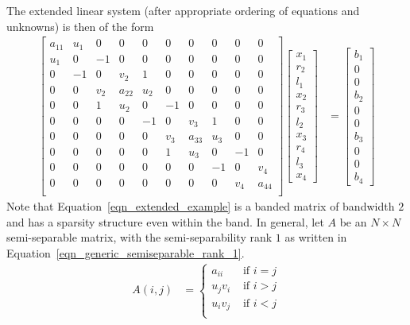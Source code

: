 \documentclass[final,leqno]{siamltex}
\begin{document}
The extended linear system (after appropriate ordering of equations and unknowns) is then of the form
\begin{align}
\begin{bmatrix}
a_{11} & u_1 & 0 & 0 & 0 & 0 & 0 & 0 & 0 & 0\\
u_1 & 0 & -1 & 0 & 0 & 0 & 0 & 0 & 0 & 0\\
0 & -1 & 0 & v_2 & 1 & 0 & 0 & 0 & 0 & 0\\
0 & 0 & v_2 & a_{22} & u_2 & 0 & 0 & 0 & 0 & 0\\
0 & 0 & 1 & u_2 & 0 & -1 & 0 & 0 & 0 & 0\\
0 & 0 & 0 & 0 & -1 & 0 & v_3 & 1 & 0 & 0\\
0 & 0 & 0 & 0 & 0 & v_3 & a_{33} & u_3 & 0 & 0\\
0 & 0 & 0 & 0 & 0 & 1 & u_{3} & 0 & -1 & 0\\
0 & 0 & 0 & 0 & 0 & 0 & 0 & -1 & 0 & v_4\\
0 & 0 & 0 & 0 & 0 & 0 & 0 & 0 & v_4 & a_{44}\\
\end{bmatrix}
\begin{bmatrix}
x_1\\
r_2\\
l_1\\
x_2\\
r_3\\
l_2\\
x_3\\
r_4\\
l_3\\
x_4
\end{bmatrix}
& =
\begin{bmatrix}
b_1\\
0\\
0\\
b_2\\
0\\
0\\
b_3\\
0\\
0\\
b_4
\end{bmatrix}
\label{eqn_extended_example}
\end{align}
Note that Equation~\eqref{eqn_extended_example} is a banded matrix of bandwidth $2$ and has a sparsity structure even within the band. In general, let $A$ be an $N \times N$ semi-separable matrix, with the semi-separability rank $1$ as written in Equation~\eqref{eqn_generic_semiseparable_rank_1}.
\begin{align}
A(i,j) & =
\begin{cases}
a_{ii} & \text{ if }i=j\\
u_j v_i & \text{ if }i> j\\
u_i v_j & \text{ if }i< j\\
\end{cases}
\label{eqn_generic_semiseparable_rank_1}
\end{align}
\end{document}

